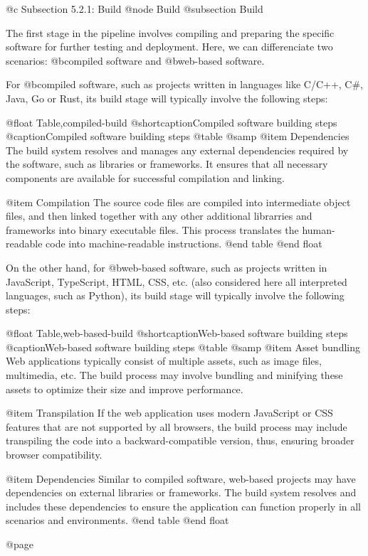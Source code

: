 @c Subsection 5.2.1: Build
@node Build
@subsection Build

The first stage in the pipeline involves compiling and preparing the specific software for further testing and deployment. Here, we can differenciate two scenarios: @b{compiled software} and @b{web-based software}.

For @b{compiled software}, such as projects written in languages like C/C++, C#, Java, Go or Rust, its build stage will typically involve the following steps:

@float Table,compiled-build
@shortcaption{Compiled software building steps}
@caption{Compiled software building steps}
@table @samp
@item Dependencies
The build system resolves and manages any external dependencies required by the software, such as libraries or frameworks. It ensures that all necessary components are available for successful compilation and linking.

@item Compilation
The source code files are compiled into intermediate object files, and then linked together with any other additional librarries and frameworks into binary executable files. This process translates the human-readable code into machine-readable instructions.
@end table
@end float

On the other hand, for @b{web-based software}, such as projects written in JavaScript, TypeScript, HTML, CSS, etc. (also considered here all interpreted languages, such as Python), its build stage will typically involve the following steps:

@float Table,web-based-build
@shortcaption{Web-based software building steps}
@caption{Web-based software building steps}
@table @samp
@item Asset bundling
Web applications typically consist of multiple assets, such as image files, multimedia, etc. The build process may involve bundling and minifying these assets to optimize their size and improve performance.

@item Transpilation
If the web application uses modern JavaScript or CSS features that are not supported by all browsers, the build process may include transpiling the code into a backward-compatible version, thus, ensuring broader browser compatibility.

@item Dependencies
Similar to compiled software, web-based projects may have dependencies on external libraries or frameworks. The build system resolves and includes these dependencies to ensure the application can function properly in all scenarios and environments.
@end table
@end float

@page
